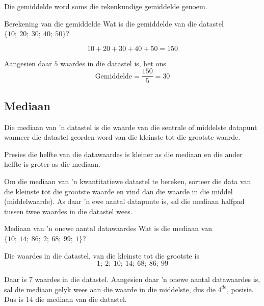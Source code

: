 Die gemiddelde word soms die rekenkundige gemiddelde genoem.
\par
{}

\begin{wex}{Berekening van die gemiddelde}
{Wat is die gemiddelde van die datastel $\{10;\ 20;\ 30;\ 40;\ 50\}$?}
{
  \begin{equation*}
    10 + 20 + 30 + 40 + 50 = 150
  \end{equation*}


  Aangesien daar $5$ waardes in die datastel is, het ons
  \begin{equation*}
    \mbox{Gemiddelde} = \frac{150}{5} = 30
  \end{equation*}
}
\end{wex}

\subsection{Mediaan}
{Die mediaan van 'n datastel is die waarde van die sentrale of middelste datapunt wanneer die datastel georden word van die kleinste tot die grootste waarde.}

Presies die helfte van die datawaardes is kleiner as die mediaan en die ander helfte is groter as die mediaan.\par

Om die mediaan van 'n kwantitatiewe datastel te bereken, sorteer die data van die kleinste tot die grootste waarde en vind dan die waarde in die middel (middelwaarde). As daar 'n ewe aantal datapunte is, sal die mediaan halfpad tussen twee waardes in die datastel wees.

\begin{wex}{Mediaan van 'n onewe aantal datawaardes}
{Wat is die mediaan van $\{10;\ 14;\ 86;\ 2;\ 68;\ 99;\ 1\}$?}
{

  Die waardes in die datastel, van die kleinste tot die grootste is
  \begin{equation*}
    1;\ 2;\ 10;\ 14;\ 68;\ 86;\ 99
  \end{equation*}


  Daar is $7$ waardes in die datastel. Aangesien daar 'n onewe aantal datawaardes is, sal die mediaan gelyk wees aan die waarde in die middelste, dus die $4^{de}$, posisie. Dus is $14$ die mediaan van die datastel.
}
\end{wex}

